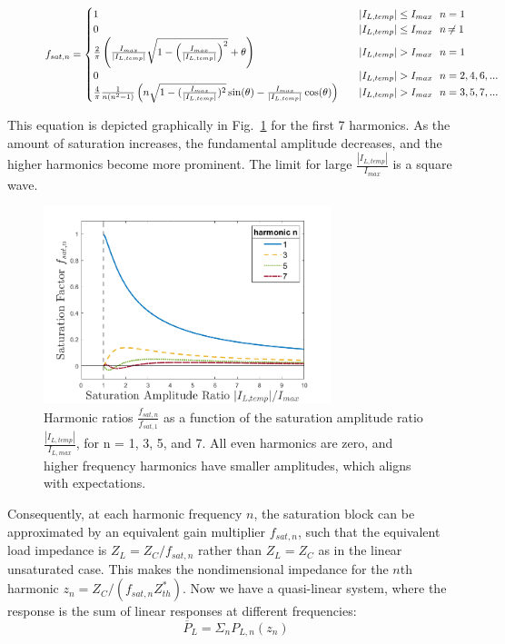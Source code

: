 \documentclass{ifacconf}
\begin{document}
\begin{figure}[htbp]
\begin{equation}\label{eq:f-sat-desc-fcn}
    f_{sat,n} =
\begin{cases}
1 & \quad |I_{L,temp}| \leq I_{max} ~\And~ n = 1\\
0 & \quad |I_{L,temp}| \leq I_{max} ~\And~ n \neq 1 \\
\frac{2}{\pi} \left(\frac{I_{max}}{|I_{L,temp}|}\sqrt{1 - \left(\frac{I_{max}}{|I_{L,temp}|}\right)^2} + \theta \right) & \quad |I_{L,temp}| > I_{max} ~\And~ n = 1 \\ 
0 & \quad |I_{L,temp}| > I_{max} ~\And~ n = 2,4,6,... \\
\frac{4}{\pi} \frac{1}{n (n^2 - 1)} \left( n \sqrt{1 - (\frac{I_{max}}{|I_{L,temp}|})^2}\sin(\theta) - \frac{I_{max}}{|I_{L,temp}|}\cos(\theta) \right) & \quad |I_{L,temp}| > I_{max} ~\And~ n = 3,5,7,...
\end{cases}
\end{equation}
\end{figure}
This equation is depicted graphically in Fig.~\ref{fig:desc-fcn} for the first 7 harmonics. As the amount of saturation increases, the fundamental amplitude decreases, and the higher harmonics become more prominent. The limit for large $\frac{|I_{L,temp}|}{I_{max}}$ is a square wave.

\begin{figure}[htbp!]
    \centering
    \includegraphics[width=8.4cm]{ifacconf_latex/figs/fsat3.png}
    \caption{Harmonic ratios $\frac{f_{sat,n}}{f_{sat,1}}$ as a function of the saturation amplitude ratio $\frac{|I_{L,temp}|}{I_{L,max}}$, for n = 1, 3, 5, and 7. All even harmonics are zero, and higher frequency harmonics have smaller amplitudes, which aligns with expectations.}
    \label{fig:desc-fcn}
\end{figure}

Consequently, at each harmonic frequency $n$, the saturation block can be approximated by an equivalent gain multiplier $f_{sat,n}$, such that the equivalent load impedance is $Z_L = Z_C / f_{sat,n}$ rather than $Z_L = Z_C$ as in the linear unsaturated case. This makes the nondimensional impedance for the $n$th harmonic $z_n = Z_C  / (f_{sat,n} Z_{th}^*)$. %
Now we have a quasi-linear system, where the response is the sum of linear responses at different frequencies:
\begin{equation}
    \overline{P}_L = \Sigma_{n} P_{L,n}(z_n)
\end{equation}
\end{document}
